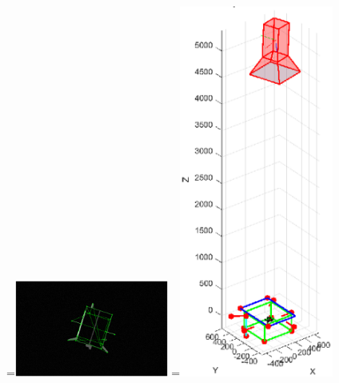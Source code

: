 \begin{figure}[htpb]
  =\hbox{\includegraphics[width=0.45\textwidth]{gfx/PoseDetermination/trial214modelMap.eps}}%
  =\hbox{\includegraphics[width=0.45\textwidth]{gfx/PoseDetermination/cameraWRTSC214.eps}}%
  {\,} \hfill
   \hfill
\end{figure}
